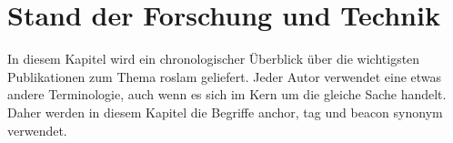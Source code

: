 %		
%		
%	
%		
%
\chapter{Stand der Forschung und Technik}

In diesem Kapitel wird ein chronologischer Überblick über die wichtigsten Publikationen zum Thema \Gls{roslam} geliefert. Jeder Autor verwendet eine etwas andere Terminologie, auch wenn es sich im Kern um die gleiche Sache handelt. Daher werden in diesem Kapitel die Begriffe \Gls{anchor}, \Gls{tag} und \Gls{beacon} synonym verwendet.


